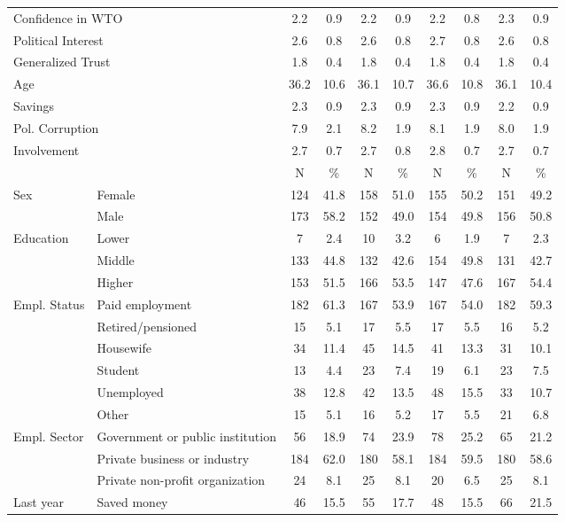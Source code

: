 \begin{table}[!htbp]
{\begin{tabular}[t]{llcccccccc}
\multicolumn{2}{l}{Confidence in WTO }  & 2.2 & 0.9 & 2.2 & 0.9 & 2.2 & 0.8 & 2.3 & 0.9\\
\multicolumn{2}{l}{Political Interest }  & 2.6 & 0.8 & 2.6 & 0.8 & 2.7 & 0.8 & 2.6 & 0.8\\
\multicolumn{2}{l}{Generalized Trust }  & 1.8 & 0.4 & 1.8 & 0.4 & 1.8 & 0.4 & 1.8 & 0.4\\
\multicolumn{2}{l}{Age }  & 36.2 & 10.6 & 36.1 & 10.7 & 36.6 & 10.8 & 36.1 & 10.4\\
\multicolumn{2}{l}{Savings }  & 2.3 & 0.9 & 2.3 & 0.9 & 2.3 & 0.9 & 2.2 & 0.9\\
\multicolumn{2}{l}{Pol. Corruption }  & 7.9 & 2.1 & 8.2 & 1.9 & 8.1 & 1.9 & 8.0 & 1.9\\
\multicolumn{2}{l}{Involvement }  & 2.7 & 0.7 & 2.7 & 0.8 & 2.8 & 0.7 & 2.7 & 0.7\\
\midrule
 &  & N & \% & N & \% & N & \% & N & \%\\
\midrule
Sex & Female & 124 & 41.8 & 158 & 51.0 & 155 & 50.2 & 151 & 49.2\\
 & Male & 173 & 58.2 & 152 & 49.0 & 154 & 49.8 & 156 & 50.8\\
Education & Lower & 7 & 2.4 & 10 & 3.2 & 6 & 1.9 & 7 & 2.3\\
 & Middle & 133 & 44.8 & 132 & 42.6 & 154 & 49.8 & 131 & 42.7\\
 & Higher & 153 & 51.5 & 166 & 53.5 & 147 & 47.6 & 167 & 54.4\\
Empl. Status & Paid employment & 182 & 61.3 & 167 & 53.9 & 167 & 54.0 & 182 & 59.3\\
 & Retired/pensioned & 15 & 5.1 & 17 & 5.5 & 17 & 5.5 & 16 & 5.2\\
 & Housewife & 34 & 11.4 & 45 & 14.5 & 41 & 13.3 & 31 & 10.1\\
 & Student & 13 & 4.4 & 23 & 7.4 & 19 & 6.1 & 23 & 7.5\\
 & Unemployed & 38 & 12.8 & 42 & 13.5 & 48 & 15.5 & 33 & 10.7\\
 & Other & 15 & 5.1 & 16 & 5.2 & 17 & 5.5 & 21 & 6.8\\
Empl. Sector & Government or public institution & 56 & 18.9 & 74 & 23.9 & 78 & 25.2 & 65 & 21.2\\
 & Private business or industry & 184 & 62.0 & 180 & 58.1 & 184 & 59.5 & 180 & 58.6\\
 & Private non-profit organization & 24 & 8.1 & 25 & 8.1 & 20 & 6.5 & 25 & 8.1\\
Last year & Saved money & 46 & 15.5 & 55 & 17.7 & 48 & 15.5 & 66 & 21.5\\

\end{tabular}}
\end{table}
